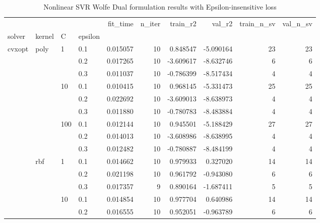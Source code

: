\begin{table}[H]
\centering
\caption{Nonlinear SVR Wolfe Dual formulation results with Epsilon-insensitive loss}
\label{nonlinear_dual_svr_cv_results}
\begin{tabular}{llllrrrrrr}
\toprule
       &     &     &     &     fit\_time &   n\_iter &  train\_r2 &     val\_r2 &  train\_n\_sv &  val\_n\_sv \\
solver & kernel & C & epsilon &              &          &           &            &             &           \\
\midrule
cvxopt & poly & 1   & 0.1 &     0.015057 &       10 &  0.848547 &  -5.090164 &          23 &        23 \\
       &     &     & 0.2 &     0.017265 &       10 & -3.609617 &  -8.632746 &           6 &         6 \\
       &     &     & 0.3 &     0.011037 &       10 & -0.786399 &  -8.517434 &           4 &         4 \\
       &     & 10  & 0.1 &     0.010415 &       10 &  0.968145 &  -5.331473 &          25 &        25 \\
       &     &     & 0.2 &     0.022692 &       10 & -3.609013 &  -8.638973 &           4 &         4 \\
       &     &     & 0.3 &     0.011880 &       10 & -0.780783 &  -8.483884 &           4 &         4 \\
       &     & 100 & 0.1 &     0.012144 &       10 &  0.945501 &  -5.188429 &          27 &        27 \\
       &     &     & 0.2 &     0.014013 &       10 & -3.608986 &  -8.638995 &           4 &         4 \\
       &     &     & 0.3 &     0.012482 &       10 & -0.780887 &  -8.484199 &           4 &         4 \\
       & rbf & 1   & 0.1 &     0.014662 &       10 &  0.979933 &   0.327020 &          14 &        14 \\
       &     &     & 0.2 &     0.021198 &       10 &  0.961792 &  -0.943080 &           6 &         6 \\
       &     &     & 0.3 &     0.017357 &        9 &  0.890164 &  -1.687411 &           5 &         5 \\
       &     & 10  & 0.1 &     0.014854 &       10 &  0.977704 &   0.640986 &          14 &        14 \\
       &     &     & 0.2 &     0.016555 &       10 &  0.952051 &  -0.963789 &           6 &         6 \\

\end{tabular}
\end{table}
